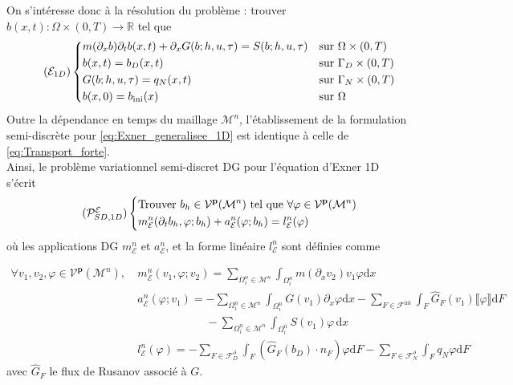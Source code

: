\documentclass[11pt, a4paper, oneside]{report}
\begin{document}
On s'intéresse donc à la résolution du problème : trouver $b(x, t) : \Omega \times (0, T) \longrightarrow \mathbb{R}$ tel que
\begin{equation} \tag{$\mathcal{E}_{1D}$} \label{eq:Exner_generalisee_1D}
    \left \{
    \begin{aligned}
        &m(\partial_x b) \partial_t b(x, t) + \partial_x G(b; h, u, \tau) = S(b; h, u, \tau) &&\text{sur } \Omega \times (0, T) \\
        &b(x, t) = b_D(x, t)    &&\text{sur } \Gamma_D \times (0, T) \\
        &G(b; h, u, \tau) = q_N(x, t)   &&\text{sur } \Gamma_N \times (0, T) \\
        &b(x, 0) = b_\text{ini}(x)  &&\text{sur } \Omega
    \end{aligned}
    \right .
\end{equation}
Outre la dépendance en temps du maillage $\mathcal{M}^n$, l'établissement de la formulation semi-discrète pour \eqref{eq:Exner_generalisee_1D} est identique à celle de \eqref{eq:Transport_forte}. \\
Ainsi, le problème variationnel semi-discret DG pour l'équation d'Exner 1D s'écrit
\begin{equation} \tag{$\mathcal{P}_{SD, 1D}^\mathcal{E}$} \label{eq:Probleme_variationnel_exner_1D}
    \left \{
    \begin{aligned}
        &\text{Trouver } b_h \in \mathcal{V}^\mathbf{p}(\mathcal{M}^n) \text{ tel que } \forall \varphi \in \mathcal{V}^\mathbf{p}(\mathcal{M}^n) \\
        &m_\mathcal{E}^n(\partial_t b_h, \varphi; b_h) + a_\mathcal{E}^n(\varphi; b_h) = l_\mathcal{E}^n(\varphi)
    \end{aligned}
    \right .
\end{equation}
où les applications DG $m_\mathcal{E}^n$ et $a_\mathcal{E}^n$, et la forme linéaire $l_\mathcal{E}^n$ sont définies comme
\begin{samepage}
\begin{equation}
    \begin{aligned}
        \forall v_1, v_2, \varphi \in \mathcal{V}^\mathbf{p}(\mathcal{M}^n), ~ &m_\mathcal{E}^n(v_1, \varphi; v_2) = \sum_{\Omega_i^n \in \mathcal{M}^n} \int_{\Omega_i^n} m(\partial_x v_2) v_1 \varphi \text{d}x \\
        &a_\mathcal{E}^n(\varphi; v_1) = - \sum_{\Omega_i^n \in \mathcal{M}^n}  \int_{\Omega_i^n} G(v_1) \partial_x \varphi \text{d}x - \sum_{F \in \mathcal{F}^\text{int}} \int_{F} \widehat{G}_F(v_1) \llbracket \varphi \rrbracket \text{d}F \\
        &\phantom{a_\mathcal{E}^n(\varphi; v_1) =} - \sum_{\Omega_i^n \in \mathcal{M}^n} \int_{\Omega_i^n} S(v_1) \varphi \, \text{d}x \\
        &l_\mathcal{E}^n(\varphi) = - \sum_{F \in \mathcal{F}_D^\partial} \int_F \left( \widehat{G}_F(b_D) \cdot n_F \right) \varphi \text{d}F - \sum_{F \in \mathcal{F}_N^\partial} \int_F q_N \varphi \text{d}F
    \end{aligned}
\end{equation}
avec $\widehat{G}_F$ le flux de Rusanov associé à $G$.
\end{samepage}
\end{document}
